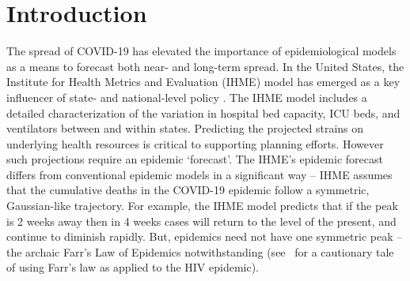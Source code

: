 \section{Introduction}
The spread of COVID-19 has elevated the importance of epidemiological
models as a means to forecast both near- and long-term spread. 
In the United States, the Institute for Health Metrics and Evaluation (IHME)
model has emerged as a key influencer of state- and national-level
policy \citep{covid2020forecasting}.  
The IHME model includes a detailed characterization
of the variation in
hospital bed capacity, ICU beds, and ventilators between and within
states. Predicting the projected strains on underlying
health resources is critical to supporting planning efforts.
However such projections require
an epidemic `forecast'.  The IHME's epidemic forecast
differs from conventional
epidemic models in a significant way -- IHME assumes
that the cumulative deaths in the COVID-19 epidemic 
follow a symmetric, Gaussian-like trajectory. 
For example, the 
IHME model predicts that if the peak is 2 weeks away then in 4 weeks
cases will return to the level of the present, and continue
to diminish rapidly.  But, epidemics need not have one symmetric peak -- 
the archaic Farr's Law of Epidemics notwithstanding
(see~\citep{bregman1990farr} for a cautionary tale of using
Farr's law as applied to the HIV epidemic). 
